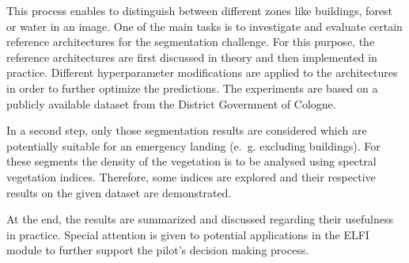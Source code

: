 This process enables to distinguish between different zones like buildings, forest or water in an image. One of the main tasks is to investigate and evaluate certain reference architectures for the segmentation challenge. For this purpose, the reference architectures are first discussed in theory and then implemented in practice. Different hyperparameter modifications are applied to the architectures in order to further optimize the predictions. The experiments are based on a publicly available dataset from the District Government of Cologne.

In a second step, only those segmentation results are considered which are potentially suitable for an emergency landing (e.~g. excluding buildings). For these segments the density of the vegetation is to be analysed using spectral vegetation indices. Therefore, some indices are explored and their respective results on the given dataset are demonstrated.

At the end, the results are summarized and discussed regarding their usefulness in practice. Special attention is given to potential applications in the ELFI module to further support the pilot's decision making process.

\clearpage